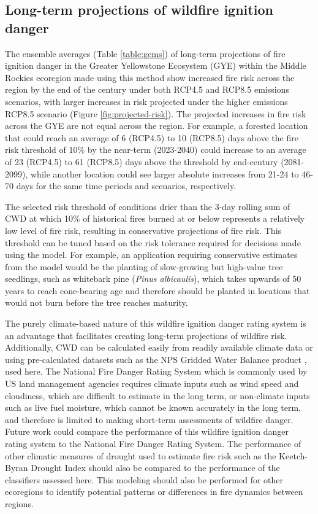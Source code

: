 \documentclass[11pt]{article}
\begin{document}
\subsection{Long-term projections of wildfire ignition danger}

The ensemble averages (Table \ref{table:gcms}) of long-term projections of fire ignition danger in the Greater Yellowstone Ecosystem (GYE) within the Middle Rockies ecoregion made using this method show increased fire risk across the region by the end of the century under both RCP4.5 and RCP8.5 emissions scenarios, with larger increases in risk projected under the higher emissions RCP8.5 scenario (Figure \ref{fig:projected-risk}). The projected increases in fire risk across the GYE are not equal across the region.  For example, a forested location that could reach an average of 6 (RCP4.5) to 10 (RCP8.5) days above the fire risk threshold of 10\% by the near-term (2023-2040) could increase to an average of 23 (RCP4.5) to 61 (RCP8.5) days above the threshold by end-century (2081-2099), while another location could see larger absolute increases from 21-24 to 46-70 days for the same time periods and scenarios, respectively.

The selected risk threshold of conditions drier than the 3-day rolling sum of CWD at which 10\% of historical fires burned at or below represents a relatively low level of fire risk, resulting in conservative projections of fire risk.  This threshold can be tuned based on the risk tolerance required for decisions made using the model.  For example, an application requiring conservative estimates from the model would be the planting of slow-growing but high-value tree seedlings, such as whitebark pine (\textit{Pinus albicaulis}), which takes upwards of 50 years to reach cone-bearing age and therefore should be planted in locations that would not burn before the tree reaches maturity.

The purely climate-based nature of this wildfire ignition danger rating system is an advantage that facilitates creating long-term projections of wildfire risk. Additionally, CWD can be calculated easily from readily available climate data or using pre-calculated datasets such as the NPS Gridded Water Balance product \citep{tercekHistoricalChangesPlant2021}, used here. The National Fire Danger Rating System \citep{degrootChapter11Wildland2015} which is commonly used by US land management agencies requires climate inputs such as wind speed and cloudiness, which are difficult to estimate in the long term, or non-climate inputs such as live fuel moisture, which cannot be known accurately in the long term, and therefore is limited to making short-term assessments of wildfire danger. Future work could compare the performance of this wildfire ignition danger rating system to the National Fire Danger Rating System. The performance of other climatic measures of drought used to estimate fire risk such as the Keetch-Byran Drought Index \citep{degrootChapter11Wildland2015} should also be compared to the performance of the classifiers assessed here.  This modeling should also be performed for other ecoregions to identify potential patterns or differences in fire dynamics between regions. 


\clearpage

\printbibliography[
heading=bibintoc,
title={References}
]
\end{document}
